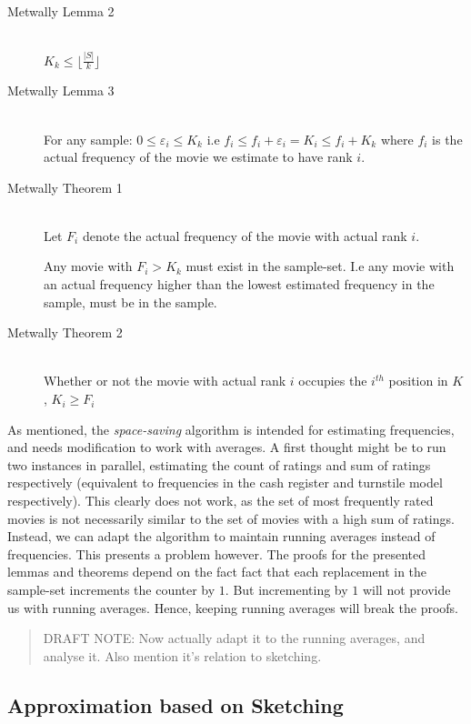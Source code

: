 {\begin{description}
\item[Metwally Lemma 2] \hfill \\
	$K_k \leq \lfloor \frac{|S|}{k} \rfloor$ 

\item[Metwally Lemma 3] \hfill \\
	For any sample: $0 \leq \varepsilon_i \leq K_k$ i.e $f_i \leq f_i
	+ \varepsilon_i = K_i \leq f_i+K_k$ where $f_i$ is the actual frequency
	of the movie we estimate to have rank $i$.

\item[Metwally Theorem 1] \hfill \\
	Let $F_i$ denote the actual frequency of the movie with actual rank $i$.

	Any movie with $F_i > K_k$ must exist in the sample-set. I.e any movie
	with an actual frequency higher than the lowest estimated frequency in
	the sample, must be in the sample.

\item[Metwally Theorem 2] \hfill \\
	Whether or not the movie with actual rank $i$ occupies the $i^{th}$
	position in $K$, $K_i \geq F_i$

\end{description}

As mentioned, the \textit{space-saving} algorithm is intended for
estimating frequencies, and needs modification to work with averages. A first
thought might be to run two instances in parallel, estimating the count of
ratings and sum of ratings respectively (equivalent to frequencies in the cash
register and turnstile model respectively). This clearly does not work, as the
set of most frequently rated movies is not necessarily similar to the set of
movies with a high sum of ratings. Instead, we can adapt the algorithm to
maintain running averages instead of frequencies. This presents a problem
however. The proofs for the presented lemmas and theorems depend on the fact
fact that each replacement in the sample-set increments the counter by $1$. But
incrementing by $1$ will not provide us with running averages. Hence, keeping
running averages will break the proofs. 

\begin{quote}
	DRAFT NOTE: Now actually adapt it
	to the running averages, and analyse it.
	Also mention it's relation to sketching.
\end{quote}

\subsection{Approximation based on Sketching}
\label{sec:sketching}

}
